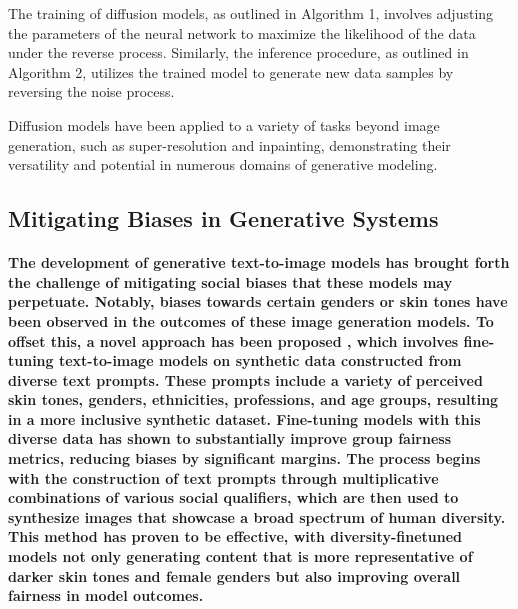 \documentclass[11pt,a4paper,oneside]{report}
\begin{document}
The training of diffusion models, as outlined in Algorithm 1, involves adjusting the parameters of the neural network to maximize the likelihood of the data under the reverse process. Similarly, the inference procedure, as outlined in Algorithm 2, utilizes the trained model to generate new data samples by reversing the noise process.

Diffusion models have been applied to a variety of tasks beyond image generation, such as super-resolution and inpainting, demonstrating their versatility and potential in numerous domains of generative modeling.


\subsection{Mitigating Biases in Generative Systems}

\paragraph{The development of generative text-to-image models has brought forth the challenge of mitigating social biases that these models may perpetuate. 
Notably, biases towards certain genders or skin tones have been observed in the outcomes of these image generation models. 
To offset this, a novel approach has been proposed \cite{esposito2023mitigating}, which involves fine-tuning text-to-image models on synthetic data constructed from diverse text prompts. 
These prompts include a variety of perceived skin tones, genders, ethnicities, professions, and age groups, resulting in a more inclusive synthetic dataset. 
Fine-tuning models with this diverse data has shown to substantially improve group fairness metrics, reducing biases by significant margins.
The process begins with the construction of text prompts through multiplicative combinations of various social qualifiers, which are then used to synthesize images that showcase a broad spectrum of human diversity. 
This method has proven to be effective, with diversity-finetuned models not only generating content that is more representative of darker skin tones and female genders but also improving overall fairness in model outcomes.}
\end{document}
